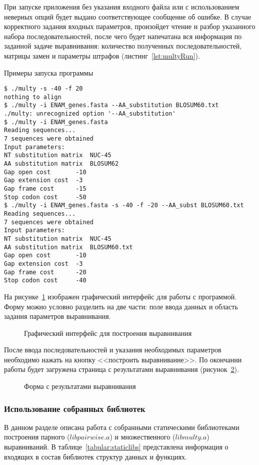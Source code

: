 При запуске приложения без указания входного файла или с использованием неверных опций будет выдано соответствующее сообщение об ошибке. В случае корректного задания входных параметров, произойдет чтение и разбор указанного набора последовательностей, после чего будет напечатана вся информация по заданной задаче выравнивания: количество полученных последовательностей, матрицы замен и параметры штрафов (листинг~\ref{lst:multyRun}).

\begin{algorithm}
	\caption{Примеры запуска программы} \label{lst:multyRun}
	\begin{lstlisting}
$ ./multy -s -40 -f 20
nothing to align
$ ./multy -i ENAM_genes.fasta --AA_substitution BLOSUM60.txt
./multy: unrecognized option '--AA_substitution'
$ ./multy -i ENAM_genes.fasta 
Reading sequences...
7 sequences were obtained
Input parameters:
NT substitution matrix	NUC-45
AA substitution matrix	BLOSUM62
Gap open cost		-10
Gap extension cost	-3
Gap frame cost		-15
Stop codon cost		-50
$ ./multy -i ENAM_genes.fasta -s -40 -f -20 --AA_subst BLOSUM60.txt
Reading sequences...
7 sequences were obtained
Input parameters:
NT substitution matrix	NUC-45
AA substitution matrix	BLOSUM60.txt
Gap open cost		-10
Gap extension cost	-3
Gap frame cost		-20
Stop codon cost		-40
	\end{lstlisting}
\end{algorithm}

На рисунке~\ref{ris:webka} изображен графический интерфейс для работы с программой. Форму можно условно разделить на две части: поле ввода данных и область задания параметров выравнивания. 

\begin{figure}[H]
	\caption{Графический интерфейс для построения выравнивания}
	\label{ris:webka}
\end{figure}

После ввода последовательностей и указания необходимых параметров необходимо нажать на кнопку <<построить выравнивание>>. По окончании работы будет загружена страница с результатами выравнивания (рисунок~\ref{ris:webkares}).

\begin{figure}[h]
	\caption{Форма с результатами выравнивания}
	\label{ris:webkares}
\end{figure}

\subsubsection[Использование собранных библиотек]{\large Использование собранных библиотек}
\hspace{\parindent} В данном разделе описана работа с собранными статическими библиотеками построения парного ($libpairwise.a$) и множественного ($libmulty.a$) выравниваний. В таблице~\ref{tabular:staticlibs} представлена информация о входящих в состав библиотек структур данных и функциях.

